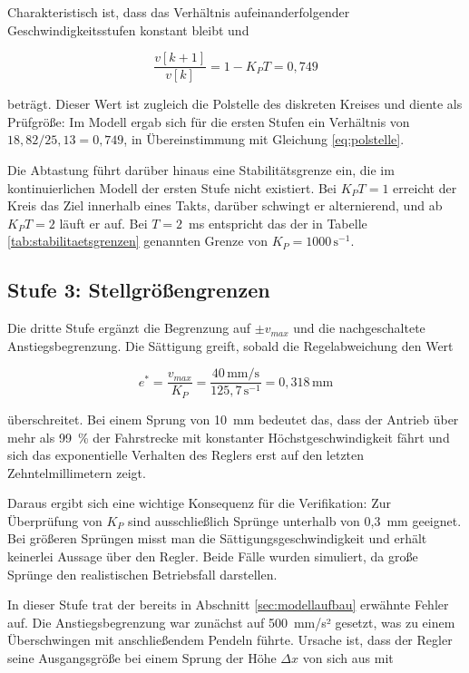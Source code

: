 Charakteristisch ist, dass das Verhältnis aufeinanderfolgender Geschwindigkeitsstufen
konstant bleibt und

\begin{equation}
    \frac{v[k+1]}{v[k]} = 1 - K_P T = 0{,}749
    \label{eq:polstelle}
\end{equation}

beträgt. Dieser Wert ist zugleich die Polstelle des diskreten Kreises und diente als
Prüfgröße: Im Modell ergab sich für die ersten Stufen ein Verhältnis von
$18{,}82 / 25{,}13 = 0{,}749$, in Übereinstimmung mit Gleichung \ref{eq:polstelle}.

Die Abtastung führt darüber hinaus eine Stabilitätsgrenze ein, die im kontinuierlichen
Modell der ersten Stufe nicht existiert. Bei $K_P T = 1$ erreicht der Kreis das Ziel
innerhalb eines Takts, darüber schwingt er alternierend, und ab $K_P T = 2$ läuft er auf.
Bei $T = 2$~ms entspricht das der in Tabelle \ref{tab:stabilitaetsgrenzen} genannten
Grenze von $K_P = 1000\,\mathrm{s^{-1}}$.

\subsection*{Stufe 3: Stellgrößengrenzen}

Die dritte Stufe ergänzt die Begrenzung auf $\pm v_{max}$ und die nachgeschaltete
Anstiegsbegrenzung. Die Sättigung greift, sobald die Regelabweichung den Wert

\begin{equation}
    e^{*} = \frac{v_{max}}{K_P} = \frac{40\,\mathrm{mm/s}}{125{,}7\,\mathrm{s^{-1}}}
    = 0{,}318\,\mathrm{mm}
    \label{eq:esat}
\end{equation}

überschreitet. Bei einem Sprung von 10~mm bedeutet das, dass der Antrieb über mehr als
99~\% der Fahrstrecke mit konstanter Höchstgeschwindigkeit fährt und sich das
exponentielle Verhalten des Reglers erst auf den letzten Zehntelmillimetern zeigt.

Daraus ergibt sich eine wichtige Konsequenz für die Verifikation: Zur Überprüfung von
$K_P$ sind ausschließlich Sprünge unterhalb von 0,3~mm geeignet. Bei größeren Sprüngen
misst man die Sättigungsgeschwindigkeit und erhält keinerlei Aussage über den Regler.
Beide Fälle wurden simuliert, da große Sprünge den realistischen Betriebsfall darstellen.

In dieser Stufe trat der bereits in Abschnitt \ref{sec:modellaufbau} erwähnte Fehler auf.
Die Anstiegsbegrenzung war zunächst auf 500~mm/s² gesetzt, was zu einem Überschwingen mit
anschließendem Pendeln führte. Ursache ist, dass der Regler seine Ausgangsgröße bei einem
Sprung der Höhe $\Delta x$ von sich aus mit

